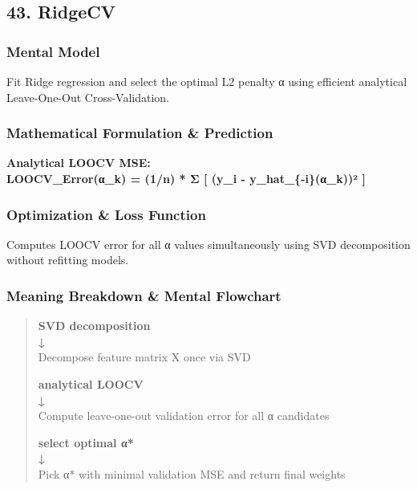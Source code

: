 \documentclass[
  10pt,
  letterpaper,
]{article}
\begin{document}
\hypertarget{ridgecv}{%
\subsection{43. RidgeCV}\label{ridgecv}}

\hypertarget{mental-model-42}{%
\subsubsection{Mental Model}\label{mental-model-42}}

Fit Ridge regression and select the optimal L2 penalty α using efficient analytical Leave-One-Out Cross-Validation.

\hypertarget{mathematical-formulation-prediction-42}{%
\subsubsection{Mathematical Formulation \& Prediction}\label{mathematical-formulation-prediction-42}}

\textbf{Analytical LOOCV MSE:\\
LOOCV\_Error(α\_k) = (1/n) * Σ {[} (y\_i - y\_hat\_\{-i\}(α\_k))² {]}}

\hypertarget{optimization-loss-function-42}{%
\subsubsection{Optimization \& Loss Function}\label{optimization-loss-function-42}}

Computes LOOCV error for all α values simultaneously using SVD decomposition without refitting models.

\hypertarget{meaning-breakdown-mental-flowchart-42}{%
\subsubsection{Meaning Breakdown \& Mental Flowchart}\label{meaning-breakdown-mental-flowchart-42}}

\begin{quote}
\textbf{SVD decomposition\\
↓\\
}Decompose feature matrix X once via SVD

\textbf{analytical LOOCV\\
↓\\
}Compute leave-one-out validation error for all α candidates

\textbf{select optimal α*\\
↓\\
}Pick α* with minimal validation MSE and return final weights
\end{quote}
\end{document}
